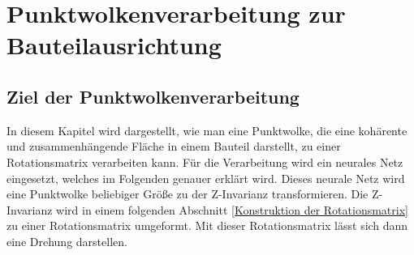 
\chapter{Punktwolkenverarbeitung zur Bauteilausrichtung}
\label{Punktwolkenverarbeitung zur Bauteilausrichtung}

\section{Ziel der Punktwolkenverarbeitung}
\label{Ziel der Punktwolkenverarbeitung}

In diesem Kapitel wird dargestellt, wie man eine Punktwolke, die eine kohärente und zusammenhängende Fläche in einem Bauteil darstellt, zu einer Rotationsmatrix verarbeiten kann. Für die Verarbeitung wird ein neurales Netz eingesetzt, welches im Folgenden genauer erklärt wird. 
Dieses neurale Netz wird eine Punktwolke beliebiger Größe zu der Z-Invarianz transformieren. Die Z-Invarianz wird in einem folgenden Abschnitt \ref{Konstruktion der Rotationsmatrix} zu einer Rotationsmatrix umgeformt. Mit dieser Rotationsmatrix lässt sich dann eine Drehung darstellen.

\smallskip

